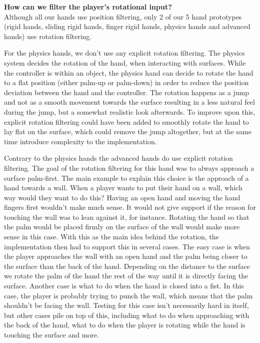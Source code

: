 
\textbf{How can we filter the player's rotational input?}\\
Although all our hands use position filtering, only 2 of our 5 hand prototypes (rigid hands, sliding rigid hands, finger rigid hands, physics hands and advanced hands) use rotation filtering.

For the physics hands, we don't use any explicit rotation filtering. The physics system decides the rotation of the hand, when interacting with surfaces. While the controller is within an object, the physics hand can decide to rotate the hand to a flat position (either palm-up or palm-down) in order to reduce the position deviation between the hand and the controller. The rotation happens as a jump and not as a smooth movement towards the surface resulting in a less natural feel during the jump, but a somewhat realistic look afterwards. To improve upon this, explicit rotation filtering could have been added to smoothly rotate the hand to lay flat on the surface, which could remove the jump altogether, but at the same time introduce complexity to the implementation.

Contrary to the physics hands the advanced hands do use explicit rotation filtering. The goal of the rotation filtering for this hand was to always approach a surface palm-first. The main example to explain this choice is the approach of a hand towards a wall. When a player wants to put their hand on a wall, which way would they want to do this? Having an open hand and moving the hand fingers first wouldn't make much sense. It would not give support if the reason for touching the wall was to lean against it, for instance. Rotating the hand so that the palm would be placed firmly on the surface of the wall would make more sense in this case. With this as the main idea behind the rotation, the implementation then had to support this in several cases. The easy case is when the player approaches the wall with an open hand and the palm being closer to the surface than the back of the hand. Depending on the distance to the surface we rotate the palm of the hand the rest of the way until it is directly facing the surface. Another case is what to do when the hand is closed into a fist. In this case, the player is probably trying to punch the wall, which means that the palm shouldn't be facing the wall. Testing for this case isn't necessarily hard in itself, but other cases pile on top of this, including what to do when approaching with the back of the hand, what to do when the player is rotating while the hand is touching the surface and more.


